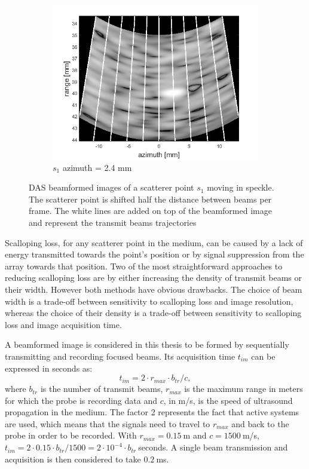 \begin{figure}[ht]
\begin{subfigure}[t]{0.48\linewidth}
        \includegraphics[width=\linewidth]{./images/others/scallop_loss3.png}
        \caption{$s_1$ azimuth = 2.4 mm}
        \label{fig:bf_im3}
    \end{subfigure}
    \caption{DAS beamformed images of a scatterer point $s_1$ moving in speckle. The scatterer point is shifted half the distance between beams per frame. The white lines are added on top of the beamformed image and represent the transmit beams trajectories}
	\label{fig:bf_im}
\end{figure}


Scalloping loss, for any scatterer point in the medium, can be caused by a lack of energy transmitted towards the point's position or by signal suppression from the array towards that position.
Two of the most straightforward approaches to reducing scalloping loss are by either increasing the density of transmit beams or their width. However both methods have obvious drawbacks. The choice of beam width is a trade-off between sensitivity to scalloping loss and image resolution, whereas the choice of their density is a trade-off between sensitivity to scalloping loss and image acquisition time.

A beamformed image is considered in this thesis to be formed by sequentially transmitting and recording focused beams. Its acquisition time $t_{im}$ can be expressed in seconds as:
\begin{equation}
    t_{im} = 2 \cdot r_{max} \cdot b_{tr} / c,
\label{eq:acquisition_time}
\end{equation}
\noindent
where $b_{tr}$ is the number of transmit beams, $r_{max}$ is the maximum range in meters for which the probe is recording data and $c$, in m/s, is the speed of ultrasound propagation in the medium. The factor 2 represents the fact that active systems are used, which means that the signals need to travel to $r_{max}$ and back to the probe in order to be recorded. With $r_{max} = 0.15~$m and $c = 1500~$m/s, $t_{im} = 2 \cdot 0.15 \cdot b_{tr} / 1500 =  2 \cdot 10^{-4} \cdot b_{tr}~$seconds. A single beam transmission and acquisition is then considered to take $0.2~$ms.

